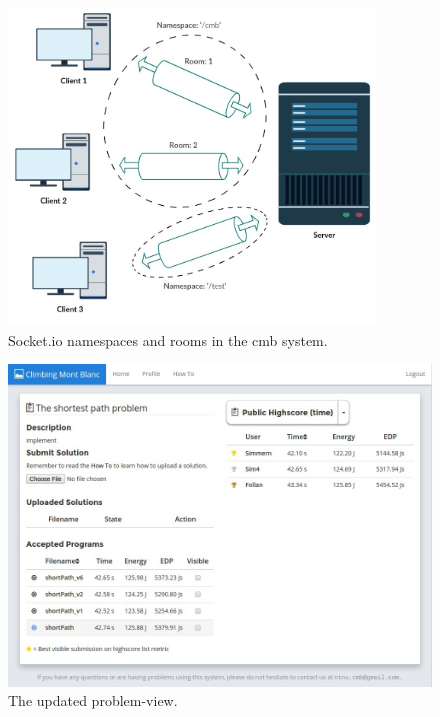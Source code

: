 \begin{figure}
    \centering
    \includegraphics[width=0.87\textwidth]{figs/namespaces_and_rooms.jpg}
    \caption[Socket.io namespaces and rooms in the Climbing Mont Blanc system]{Socket.io namespaces and rooms in the \gls{cmb} system.}
    \label{fig:namespaces-and-rooms}
\end{figure}

\begin{figure}
    \includegraphics[width=1.0\textwidth]{figs/problem_view.jpg}
    \caption[The updated problem-view]{The updated problem-view.}
    \label{fig:problem-view}
\end{figure}

